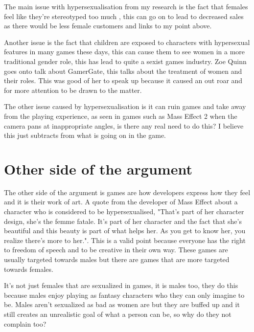 \documentclass{scrartcl}
\begin{document}
The main issue with hypersexualisation from my research is the fact that females feel like they're stereotyped too much \cite{heron2014sexism}, this can go on to lead to decreased sales as there would be less female customers\cite{stats} and links to my point above.  \newline


Another issue is the fact that children are exposed to characters with hypersexual features\cite{martin2011playing} in many games these days, this can cause them to see women in a more traditional gender role\cite{martin2011playing}, this has lead to quite a sexist games industry. Zoe Quinn goes onto talk about GamerGate\cite{gamergate}\cite{bowey2017don}, this talks about the treatment of women and their roles. This was good of her to speak up because it caused an out roar and for more attention to be drawn to the matter. \newline 


The other issue caused by hypersexualisation is it can ruin games and take away from the playing experience\cite{venturebeat}, as seen in games such as Mass Effect 2 when the camera pans at inappropriate angles, is there any real need to do this? I believe this just subtracts from what is going on in the game.


\section{Other side of the argument}
The other side of the argument is games are how developers express how they feel and it is their work of art. A quote from the developer of Mass Effect about a character who is considered to be hypersexualised, "That's part of her character design, she's the femme fatale. It's part of her character and the fact that she's beautiful and this beauty is part of what helps her. As you get to know her, you realize there's more to her."\cite{venturebeat}.  This is a valid point because everyone has the right to freedom of speech and to be creative in their own way. These games are usually targeted towards males but there are games that are more targeted towards females\cite{bowey2017don}\cite{waern2005hypersexual}. \newline


It's not just females that are sexualized in games, it is males too\cite{heron2014sexism}, they do this because males enjoy playing as fantasy characters who they can only imagine to be. Males aren't sexualized as bad as women are but they are buffed up and it still creates an unrealistic goal of what a person can be, so why do they not complain too?
\end{document}
